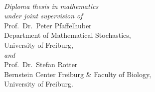 \begin{titlepage}
	\begin{addmargin}[-1cm]{-3cm}
    \begin{center}
        \large  

        \hfill

        \vfill

        \begingroup
           \spacedallcaps{\myTitle} \\ \bigskip
        \endgroup

        \medskip
        \spacedlowsmallcaps{\myName}

        \vfill


        \textit{Diploma thesis in mathematics\\ under joint
        supervision of} \\
        \bigskip
        \bigskip
        \medskip
        Prof.\ Dr.\ Peter Pfaffelhuber \\ 
        Department of Mathematical Stochastics, \\
        University of Freiburg,\\
        \medskip
        \textit{and} \\ 
        \medskip
        Prof.\ Dr.\ Stefan Rotter \\
        Bernstein Center Freiburg \& Faculty of Biology, \\
        University of Freiburg. \\

        \bigskip 
        \bigskip
        \vspace{1cm}
        \textit{\myUni} \\ \bigskip

        \textit{\myTime}\ 

        \vfill                      

    \end{center}  
  \end{addmargin}       
\end{titlepage}   


